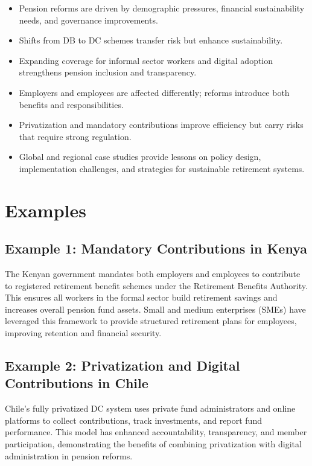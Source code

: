 \documentclass[12pt,a4paper]{article}
\begin{document}
\begin{itemize}
    \item Pension reforms are driven by demographic pressures, financial sustainability needs, and governance improvements.
    \item Shifts from DB to DC schemes transfer risk but enhance sustainability.
    \item Expanding coverage for informal sector workers and digital adoption strengthens pension inclusion and transparency.
    \item Employers and employees are affected differently; reforms introduce both benefits and responsibilities.
    \item Privatization and mandatory contributions improve efficiency but carry risks that require strong regulation.
    \item Global and regional case studies provide lessons on policy design, implementation challenges, and strategies for sustainable retirement systems.
\end{itemize}

\section{Examples}

\subsection*{Example 1: Mandatory Contributions in Kenya}

The Kenyan government mandates both employers and employees to contribute to registered retirement benefit schemes under the Retirement Benefits Authority. This ensures all workers in the formal sector build retirement savings and increases overall pension fund assets. Small and medium enterprises (SMEs) have leveraged this framework to provide structured retirement plans for employees, improving retention and financial security.

\subsection*{Example 2: Privatization and Digital Contributions in Chile}

Chile's fully privatized DC system uses private fund administrators and online platforms to collect contributions, track investments, and report fund performance. This model has enhanced accountability, transparency, and member participation, demonstrating the benefits of combining privatization with digital administration in pension reforms.
\end{document}
